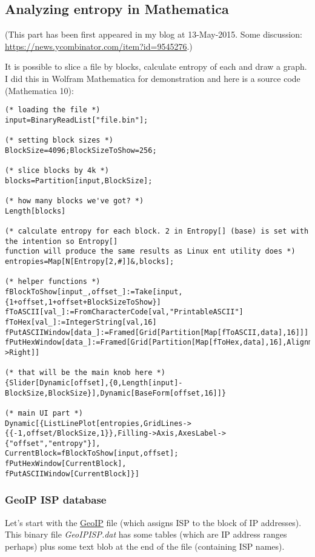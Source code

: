 \subsection{Analyzing entropy in Mathematica}
\newcommand{\EntropyGfxScale}{0.8\textwidth}

(This part has been first appeared in my blog at 13-May-2015.
Some discussion: \url{https://news.ycombinator.com/item?id=9545276}.)

It is possible to slice a file by blocks, calculate entropy of each and draw a graph.
I did this in Wolfram Mathematica for demonstration and here is a source code (Mathematica 10):

\begin{lstlisting}[style=custommath]
(* loading the file *)
input=BinaryReadList["file.bin"];

(* setting block sizes *)
BlockSize=4096;BlockSizeToShow=256;

(* slice blocks by 4k *)
blocks=Partition[input,BlockSize];

(* how many blocks we've got? *)
Length[blocks]

(* calculate entropy for each block. 2 in Entropy[] (base) is set with the intention so Entropy[] 
function will produce the same results as Linux ent utility does *)
entropies=Map[N[Entropy[2,#]]&,blocks];

(* helper functions *)
fBlockToShow[input_,offset_]:=Take[input,{1+offset,1+offset+BlockSizeToShow}]
fToASCII[val_]:=FromCharacterCode[val,"PrintableASCII"]
fToHex[val_]:=IntegerString[val,16]
fPutASCIIWindow[data_]:=Framed[Grid[Partition[Map[fToASCII,data],16]]]
fPutHexWindow[data_]:=Framed[Grid[Partition[Map[fToHex,data],16],Alignment->Right]]

(* that will be the main knob here *)
{Slider[Dynamic[offset],{0,Length[input]-BlockSize,BlockSize}],Dynamic[BaseForm[offset,16]]}

(* main UI part *)
Dynamic[{ListLinePlot[entropies,GridLines->{{-1,offset/BlockSize,1}},Filling->Axis,AxesLabel->{"offset","entropy"}],
CurrentBlock=fBlockToShow[input,offset];
fPutHexWindow[CurrentBlock],
fPutASCIIWindow[CurrentBlock]}]
\end{lstlisting}

\subsubsection{GeoIP ISP database}

Let's start with the \href{https://www.maxmind.com/en/geoip-demo}{GeoIP} file (which assigns ISP to the block of IP addresses).
This binary file \emph{GeoIPISP.dat} has some tables (which are IP address ranges perhaps)
plus some text blob at the end of the file (containing ISP names).

